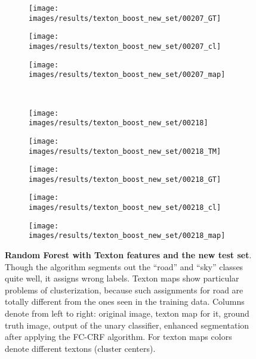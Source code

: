 \begin{figure}[t]
\begin{subfigure}[c]{0.19\textwidth}
 \end{subfigure}
 \begin{subfigure}[c]{0.19\textwidth}
  \centering
  \texttt{[image: images/results/texton\_boost\_new\_set/00207\_GT]}
 \end{subfigure}
 \begin{subfigure}[c]{0.19\textwidth}
  \centering
  \texttt{[image: images/results/texton\_boost\_new\_set/00207\_cl]}
 \end{subfigure}
 \begin{subfigure}[c]{0.19\textwidth}
  \centering
  \texttt{[image: images/results/texton\_boost\_new\_set/00207\_map]}
 \end{subfigure}
 \\
 \begin{subfigure}[c]{0.19\textwidth}
  \centering
  \texttt{[image: images/results/texton\_boost\_new\_set/00218]}
 \end{subfigure}
 \begin{subfigure}[c]{0.19\textwidth}
  \centering
  \texttt{[image: images/results/texton\_boost\_new\_set/00218\_TM]}
 \end{subfigure}
 \begin{subfigure}[c]{0.19\textwidth}
  \centering
  \texttt{[image: images/results/texton\_boost\_new\_set/00218\_GT]}
 \end{subfigure}
 \begin{subfigure}[c]{0.19\textwidth}
  \centering
  \texttt{[image: images/results/texton\_boost\_new\_set/00218\_cl]}
 \end{subfigure}
 \begin{subfigure}[c]{0.19\textwidth}
  \centering
  \texttt{[image: images/results/texton\_boost\_new\_set/00218\_map]}
 \end{subfigure}
 \caption[Random Forest with Texton features and the new test set]{
 {\bf Random Forest with Texton features and the new test set}. Though the algorithm segments out the ``road'' and ``sky'' classes quite well,
 it assigns wrong labels. Texton maps show particular problems of clusterization, because such assignments for road are totally different from
 the ones seen in the training data.
 Columns denote from left to right: original image, texton map for it, ground truth image, output of the unary classifier, enhanced segmentation 
 after applying the FC-CRF algorithm. For texton maps colors denote different textons (cluster centers).}
 \label{fig:new_set_textonboost_fails}
\end{figure}

